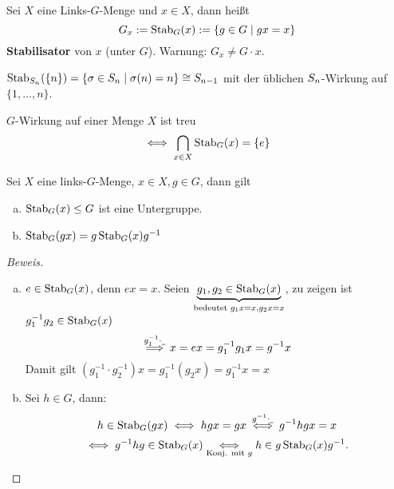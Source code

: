 \documentclass[a4paper]{report}
\begin{document}
\begin{defi}
  Sei $X$ eine Links-$G$-Menge und $x \in X$, dann heißt
  \[G_{x} := \operatorname{Stab}_{G}(x) := \{g \in G \mid gx = x\}\]
  \textbf{Stabilisator} von $x$ (unter $G$).
  Warnung: $G_{x} \ne G\cdot x$.
\end{defi}
\begin{bsp*}
  $\operatorname{Stab}_{S_n}(\{n\}) = \{\sigma \in S_n \mid \sigma(n) = n\} \cong S_{n-1}$ mit der üblichen $S_n$-Wirkung auf $\{1, ..., n\}$.
\end{bsp*}
\begin{ubng*}
  $G$-Wirkung auf einer Menge $X$ ist treu
  \[\iff \bigcap_{x \in X} \operatorname{Stab}_{G}(x) = \{e\}\]
\end{ubng*}
\begin{prop}
  Sei $X$ eine links-$G$-Menge, $x \in X, g \in G$, dann gilt
  \begin{enumerate}[(a)]
    \item $\operatorname{Stab}_{G}(x) \le G$ ist eine Untergruppe.
    \item $\operatorname{Stab}_{G}(gx) = g\operatorname{Stab}_{G}(x)g^{-1}$
  \end{enumerate}
\end{prop}
\begin{proof}[Beweis] \item
  \begin{enumerate}[(a)]
    \item $e \in \operatorname{Stab}_{G}(x)$, denn $ex = x$. Seien $\underbrace{g_{1}, g_{2} \in \operatorname{Stab}_{G}(x)}_{\substack{\text{bedeutet } g_{1}x = x, g_{2} x= x}}$, zu zeigen ist $g_{1}^{-1}g_{2} \in \operatorname{Stab}_{G}(x)$
          \[\overset{g_{1}^{-1}\cdot \underline\ }{\implies} x = ex = g_{1}^{-1}g_{1}x = g^{-1}x\]
          Damit gilt $(g_{1}^{-1}\cdot g_{2}^{-1})x = g_{1}^{-1}(g_{2}x) = g_{1}^{-1}x = x$
    \item Sei $h \in G$, dann:
          \[h \in \operatorname{Stab}_{G}(gx) \iff hgx = gx \overset{g^{-1}\cdot \underline\ } \iff g^{-1}hgx = x \]
          \[ \iff g^{-1}hg \in \operatorname{Stab}_{G}(x) \underset{\text{Konj. mit } g} \iff h \in g \operatorname{Stab}_{G}(x)g^{-1}. \qedhere\]
  \end{enumerate}
\end{proof}
\end{document}
